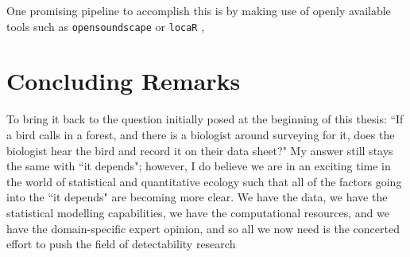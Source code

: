 \par One promising pipeline to accomplish this is by making use of openly available tools such as \texttt{opensoundscape} \citep{lapp_open_2023} or \texttt{locaR} \citep{becker_locar_2023}, 


\section{Concluding Remarks}
\par To bring it back to the question initially posed at the beginning of this thesis: ``If a bird calls in a forest, and there is a biologist around surveying for it, does the biologist hear the bird and record it on their data sheet?"
My answer still stays the same with ``it depends"; however, I do believe we are in an exciting time in the world of statistical and quantitative ecology such that all of the factors going into the ``it depends" are becoming more clear.
We have the data, we have the statistical modelling capabilities, we have the computational resources, and we have the domain-specific expert opinion, and so all we now need is the concerted effort to push the field of detectability research

